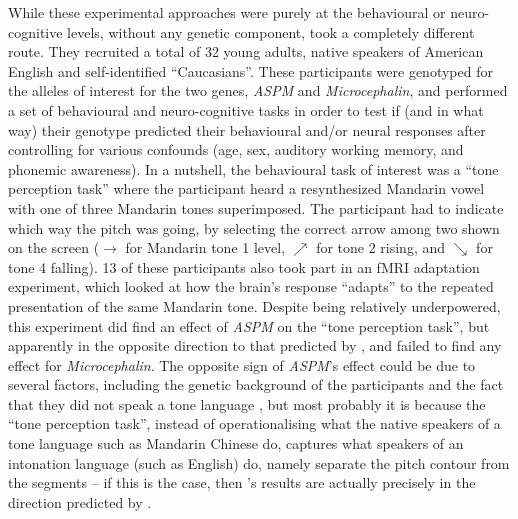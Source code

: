 \documentclass[twoside,onecolumn]{article}
\begin{document}
While these experimental approaches were purely at the behavioural or neuro-cognitive levels, without any genetic component, \citet{wong_plosone_2012} took a completely different route.
They recruited a total of 32 young adults, native speakers of American English and self-identified ``Caucasians''.
These participants were genotyped for the alleles of interest for the two genes, \textit{ASPM} and \textit{Microcephalin}, and performed a set of behavioural and neuro-cognitive tasks in order to test if (and in what way) their genotype predicted their behavioural and/or neural responses after controlling for various confounds (age, sex, auditory working memory, and phonemic awareness).
In a nutshell, the behavioural task of interest was a ``tone perception task'' where the participant heard a resynthesized Mandarin vowel with one of three Mandarin tones superimposed.
The participant had to indicate which way the pitch was going, by selecting the correct arrow among two shown on the screen ($\rightarrow$ for Mandarin tone 1 level, $\nearrow$ for tone 2 rising, and $\searrow$ for tone 4 falling).
13 of these participants also took part in an fMRI adaptation experiment, which looked at how the brain's response ``adapts'' to the repeated presentation of the same Mandarin tone.
Despite being relatively underpowered, this experiment did find an effect of \textit{ASPM} on the ``tone perception task'', but apparently in the opposite direction to that predicted by \citet{dediu_ladd_2007}, and failed to find any effect for \textit{Microcephalin}.
The opposite sign of \textit{ASPM}'s effect could be due to several factors, including the genetic background of the participants and the fact that they did not speak a tone language \citep{wong_plosone_2012}, but most probably it is because the ``tone perception task'', instead of operationalising what the native speakers of a tone language such as Mandarin Chinese do, captures what speakers of an intonation language (such as English) do, namely separate the pitch contour from the segments \citep[p. 340]{caldwellharris_factors_2015} -- if this is the case, then \citet{wong_plosone_2012}'s results are actually precisely in the direction predicted by \citet{dediu_ladd_2007}.
\end{document}

